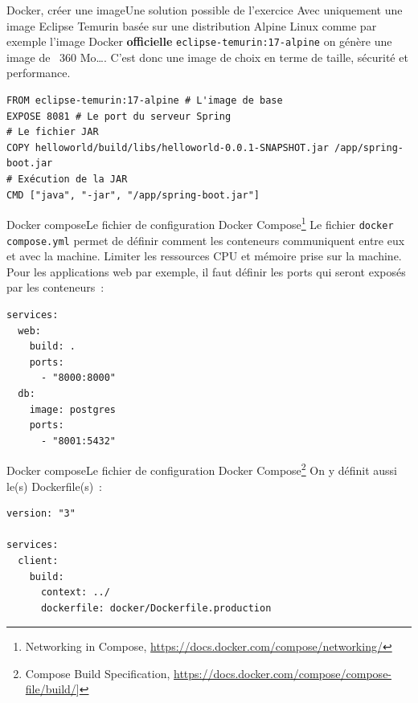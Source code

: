 \documentclass{beamer}
\begin{document}
    \begin{frame}[fragile]{Docker, créer une image}{Une solution possible de l'exercice}
        Avec uniquement une image Eclipse Temurin basée sur une distribution Alpine Linux comme par exemple l'image Docker \textbf{officielle} \lstinline{eclipse-temurin:17-alpine} on génère une image de  ~360 Mo\ldots.
        \bigbreak
        \bigbreak
        C'est donc une image de choix en terme de taille, sécurité et performance.
        \begin{lstlisting}
FROM eclipse-temurin:17-alpine # L'image de base
EXPOSE 8081 # Le port du serveur Spring
# Le fichier JAR
COPY helloworld/build/libs/helloworld-0.0.1-SNAPSHOT.jar /app/spring-boot.jar
# Exécution de la JAR
CMD ["java", "-jar", "/app/spring-boot.jar"]
        \end{lstlisting}
    \end{frame}

    \begin{frame}[fragile]{Docker compose}{Le fichier de configuration Docker Compose\footnote{Networking in Compose, \url{https://docs.docker.com/compose/networking/}}}
        Le fichier \lstinline{docker compose.yml} permet de définir comment les conteneurs communiquent entre eux et avec la machine.
        Limiter les ressources CPU et mémoire prise sur la machine.
        \bigbreak
        Pour les applications web par exemple, il faut définir les ports qui seront exposés par les conteneurs~:
        \begin{lstlisting}
services:
  web:
    build: .
    ports:
      - "8000:8000"
  db:
    image: postgres
    ports:
      - "8001:5432"
        \end{lstlisting}
    \end{frame}

    \begin{frame}[fragile]{Docker compose}{Le fichier de configuration Docker Compose\footnote{Compose Build Specification, \url{https://docs.docker.com/compose/compose-file/build/}]}}
        On y définit aussi le(s) Dockerfile(s)~:
        \begin{lstlisting}
version: "3"

services:
  client:
    build:
      context: ../
      dockerfile: docker/Dockerfile.production
        \end{lstlisting}
    \end{frame}
\end{document}
